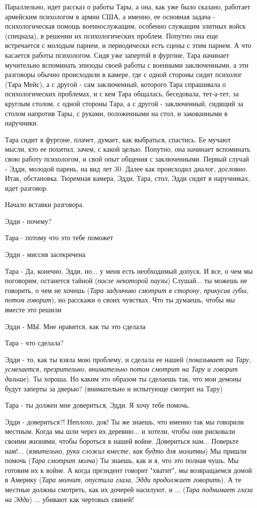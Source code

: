 Параллельно, идет рассказ о работы Тары, а она, как уже было сказано, работает
армейским психологом в армии США, а именно, ее основная задача -
психологическая помощь военнослужащим, особенно служащим элитных войск
(спецназа), в решении их психологических проблем. Попутно она еще встречается с
молодым парнем, и периодически есть сцены с этим парнем. А что касается работы
психологом. Сидя уже запертой в фургоне, Тара начинает мучительно вспоминать
эпизоды своей работы с военными заключенными, а эти разговоры обычно
происходили в камере, где с одной стороны сидит психолог (Тара Мейс), а с
другой - сам заключенный, которого Тара спрашивала о психологических проблемах,
и с кем Тара общалась, беседовала, тет-а-тет, за круглым столом, с одной
стороны Тара, а с другой - заключенный, сидящий за столом напротив Тары, с
руками, положенными на стол, и закованными в наручники.

Тара сидит в фургоне, плачет, думает, как выбраться, спастись. Ее мучают мысли,
кто ее похитил, зачем, с какой целью. Попутно, она начинает вспоминать свою
работу психологом, и свой опыт общения с заключенными. Первый случай - Эдди, молодой парень, на вид лет 30.
Далее как происходил диалог, дословно. Итак, обстановка. Тюремная камера, Эдди, Тара,
стол, Эдди сидит в наручниках, идет разговор.

Начало вставки разговора.

Эдди - почему?

Тара - потому что это тебе поможет

Эдди - миссия засекречена

Тара - Да, конечно, Эдди, но... у меня есть необходимый допуск. И все, о чем мы
поговорим, останется тайной (\emph{после некоторой паузы}) Слушай... ты можешь не
говорить, о чем не хочешь (\emph{Тара задумчиво смотрит в сторону, прикусив губы,
потом говорит}), но расскажи о своих чувствах. Что ты думаешь, чтобы мы вместе
это решили

Эдди - МЫ. Мне нравится, как ты это сделала

Тара - что сделала? 

Эдди - то, как ты взяла мою проблему, и сделала ее нашей (\emph{показывает на Тару,
усмехается, презрительно, внимательно потом смотрит на Тару и говорит дальше}).
Ты хороша. Но каким это образом ты сделаешь так, что мои демоны будут заперты
за дверью? (внимательно и испытующе смотрит на Тару)

Тара - ты должен мне довериться, Эдди. Я хочу тебе помочь. 

Эдди - довериться?! Неплохо, док! Ты же знаешь, что именно так мы говорили
местным. Когда мы шли через их деревню... и хотели, чтобы они рисковали своими
жизнями, чтобы бороться в нашей войне. Довериться нам...  Поверьте нам!...
(\emph{язвительно, руки сложил вместе, как будто для молитвы}) Мы пришли помочь
(\emph{Тара смотрит молча}) Ты знаешь, как и я, что это полная чушь. Мы готовим
их к войне. А когда президент говорит "хватит", мы возвращаемся домой в Америку
(\emph{Тара молчит, опустила глаза, Эдди продолжает говорить}). А те местные
должны смотреть, как их дочерей насилуют, и ... (\emph{Тара поднимает глаза на
Эдди}) ... убивают как чертовых свиней!

